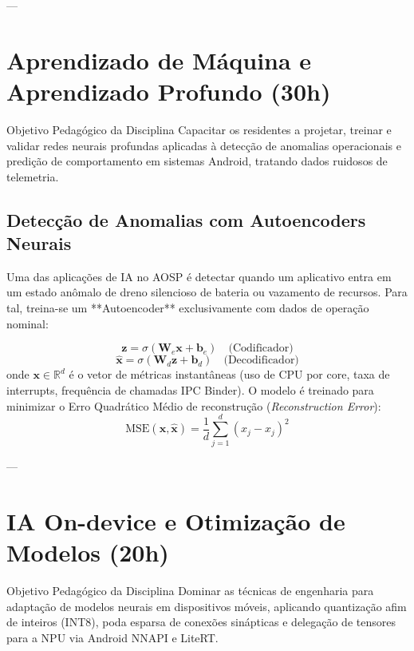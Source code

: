 ---

\section{Aprendizado de Máquina e Aprendizado Profundo (30h)}

\begin{pedagogico}{Objetivo Pedagógico da Disciplina}
Capacitar os residentes a projetar, treinar e validar redes neurais profundas aplicadas à detecção de anomalias operacionais e predição de comportamento em sistemas Android, tratando dados ruidosos de telemetria.
\end{pedagogico}

\subsection{Detecção de Anomalias com Autoencoders Neurais}
Uma das aplicações de IA no AOSP é detectar quando um aplicativo entra em um estado anômalo de dreno silencioso de bateria ou vazamento de recursos. Para tal, treina-se um **Autoencoder** exclusivamente com dados de operação nominal:

\begin{equation}
    \mathbf{z} = \sigma(\mathbf{W}_e \mathbf{x} + \mathbf{b}_e) \quad \text{(Codificador)}
\end{equation}
\begin{equation}
    \hat{\mathbf{x}} = \sigma(\mathbf{W}_d \mathbf{z} + \mathbf{b}_d) \quad \text{(Decodificador)}
\end{equation}
onde $\mathbf{x} \in \mathbb{R}^d$ é o vetor de métricas instantâneas (uso de CPU por core, taxa de interrupts, frequência de chamadas IPC Binder). O modelo é treinado para minimizar o Erro Quadrático Médio de reconstrução (\textit{Reconstruction Error}):
\begin{equation}
    \text{MSE}(\mathbf{x}, \hat{\mathbf{x}}) = \frac{1}{d} \sum_{j=1}^{d} (x_j - \hat{x}_j)^2
\end{equation}

---

\section{IA On-device e Otimização de Modelos (20h)}

\begin{pedagogico}{Objetivo Pedagógico da Disciplina}
Dominar as técnicas de engenharia para adaptação de modelos neurais em dispositivos móveis, aplicando quantização afim de inteiros (INT8), poda esparsa de conexões sinápticas e delegação de tensores para a NPU via Android NNAPI e LiteRT.
\end{pedagogico}

